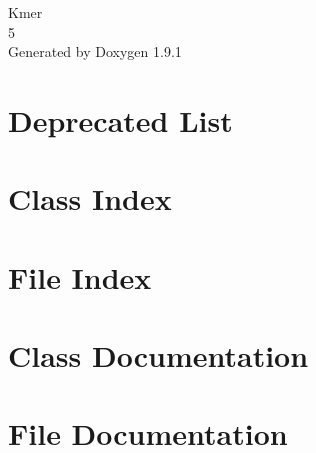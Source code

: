 \let\mypdfximage\pdfximage\def\pdfximage{\immediate\mypdfximage}\documentclass[twoside]{book}
\newcommand{\+}{\discretionary{\mbox{\scriptsize$\hookleftarrow$}}{}{}}
\newcommand{\clearemptydoublepage}{%
  \newpage{\pagestyle{empty}\cleardoublepage}%
}
\begin{document}
\raggedbottom

\hypersetup{pageanchor=false,
             bookmarksnumbered=true,
             pdfencoding=unicode
            }
\begin{titlepage}
\vspace*{7cm}
\begin{center}%
{\Large Kmer \\[1ex]\large 5 }\\
\vspace*{1cm}
{\large Generated by Doxygen 1.9.1}\\
\end{center}
\end{titlepage}
\clearemptydoublepage
{}
\tableofcontents
\clearemptydoublepage
{}
\hypersetup{pageanchor=true}

\chapter{Deprecated List}
\label{deprecated}

\chapter{Class Index}

\chapter{File Index}

\chapter{Class Documentation}




\chapter{File Documentation}









\backmatter
\newpage
{}
\clearemptydoublepage
{}
\printindex
\end{document}
